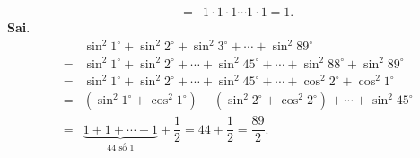 \begin{ex}
{\begin{itemchoice}
\begin{eqnarray*}
	&=& 1 \cdot 1 \cdot 1 \cdots 1 \cdot 1 = 1.
	\end{eqnarray*}	
	\itemch \textbf{Sai}. 
	\allowdisplaybreaks
	\begin{eqnarray*}	
	&&\sin^2 1^\circ + \sin^2 2^\circ + \sin^2 3^\circ + \cdots + \sin^2 89^\circ \\
	&=& \sin^2 1^\circ + \sin^2 2^\circ + \cdots + \sin^2 45^\circ + \cdots + \sin^2 88^\circ + \sin^2 89^\circ \\
	&=& \sin^2 1^\circ + \sin^2 2^\circ + \cdots + \sin^2 45^\circ + \cdots + \cos^2 2^\circ + \cos^2 1^\circ \\
	&=& (\sin^2 1^\circ + \cos^2 1^\circ) + (\sin^2 2^\circ + \cos^2 2^\circ) + \cdots + \sin^2 45^\circ\\
	&=& \underbrace{1 + 1 + \cdots + 1}_{44 \text{ số } 1} + \dfrac{1}{2} = 44 + \dfrac{1}{2} = \dfrac{89}{2}.
	\end{eqnarray*}	
	\end{itemchoice}
	}
\end{ex}
